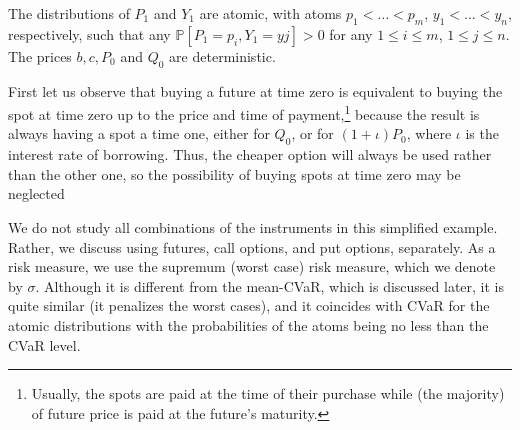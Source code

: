 \documentclass[3p,times]{elsarticle}
\begin{document}
The distributions of $P_1$ and $Y_1$ are atomic, with atoms $p_1<\dots<p_m$, $y_1< \dots < y_n$, respectively, such that any $\mathbb{P}[P_1=p_i,Y_1=yj] > 0$ for any $1\leq i \leq m$, $1\leq j \leq n$. 
The prices $b,c,P_0$ and $Q_0$ are deterministic.

First let us observe that buying a future at time zero is equivalent to buying the spot at time zero up to the price and time of payment,\footnote{Usually, the spots are paid at the time of their purchase  while (the majority) of future price is paid at the future's maturity.} because the result is always having a spot a time one, either for $Q_0$, or for $(1+\iota) P_0$, where $\iota$ is the interest rate of borrowing. Thus, the cheaper option will always be used rather than the other one, so the possibility of buying spots at time zero may be neglected

We do not study all combinations of the instruments in this simplified example. Rather, we discuss using futures, call options, and put options, separately. As a risk measure, we use the supremum (worst case) risk measure, which we denote by $\sigma$. Although it is different from the mean-CVaR, which is discussed later, it is quite similar (it penalizes the worst cases), and it coincides with CVaR for the atomic distributions with the probabilities of the atoms being no less than the CVaR level. 
\end{document}
